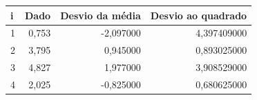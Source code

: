 \begin{tabular}{lrrr}
\toprule
i & Dado & Desvio da média & Desvio ao quadrado \\
\midrule
1 & 0,753 & -2,097000 & 4,397409000 \\
2 & 3,795 & 0,945000 & 0,893025000 \\
3 & 4,827 & 1,977000 & 3,908529000 \\
4 & 2,025 & -0,825000 & 0,680625000 \\
\bottomrule
\end{tabular}
